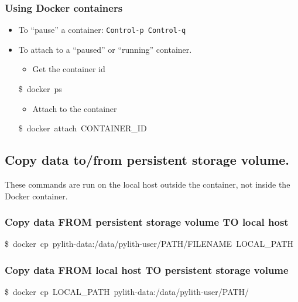 \subsubsection{Using Docker containers}
\begin{itemize}
\item To ``pause'' a container: \texttt{Control-p Control-q}
\item To attach to a ``paused'' or ``running'' container.

\begin{itemize}
\item Get the container id\end{itemize}
\begin{lyxcode}
\$~docker~ps\end{lyxcode}
\begin{itemize}
\item Attach to the container\end{itemize}
\begin{lyxcode}
\$~docker~attach~CONTAINER\_ID
\end{lyxcode}
\end{itemize}

\subsection{Copy data to/from persistent storage volume.}

These commands are run on the local host outside the container, not
inside the Docker container.


\subsubsection{Copy data FROM persistent storage volume TO local host}
\begin{lyxcode}
\$~docker~cp~pylith-data:/data/pylith-user/PATH/FILENAME~LOCAL\_PATH
\end{lyxcode}

\subsubsection{Copy data FROM local host TO persistent storage volume}
\begin{lyxcode}
\$~docker~cp~LOCAL\_PATH~pylith-data:/data/pylith-user/PATH/
\end{lyxcode}

